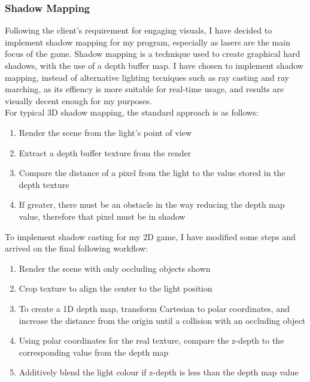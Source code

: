 \documentclass[../main/main.tex]{subfiles}
\begin{document}
\subsubsection{Shadow Mapping}
Following the client's requirement for engaging visuals, I have decided to implement shadow mapping for my program, especially as lasers are the main focus of the game. Shadow mapping is a technique used to create graphical hard shadows, with the use of a depth buffer map. I have chosen to implement shadow mapping, instead of alternative lighting tecniques such as ray casting and ray marching, as its effiency is more suitable for real-time usage, and results are visually decent enough for my purposes.
\\
For typical 3D shadow mapping, the standard approach is as follows:

\begin{enumerate}
\item Render the scene from the light's point of view
\item Extract a depth buffer texture from the render
\item Compare the distance of a pixel from the light to the value stored in the depth texture
\item If greater, there must be an obstacle in the way reducing the depth map value, therefore that pixel must be in shadow
\end{enumerate} 

\noindent To implement shadow casting for my 2D game, I have modified some steps and arrived on the final following workflow:

\begin{enumerate}
\item Render the scene with only occluding objects shown
\item Crop texture to align the center to the light position
\item To create a 1D depth map, transform Cartesian to polar coordinates, and increase the distance from the origin until a collision with an occluding object
\item Using polar coordinates for the real texture, compare the z-depth to the corresponding value from the depth map
\item Additively blend the light colour if z-depth is less than the depth map value
\end{enumerate}
\end{document}
